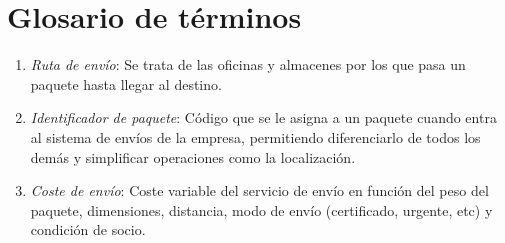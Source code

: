 \newpage

\section{Glosario de términos}
	\begin{enumerate}
		\item \textit{Ruta de envío}: Se trata de las oficinas y almacenes por los que pasa un paquete hasta llegar al destino.
		\item \textit{Identificador de paquete}: Código que se le asigna a un paquete cuando entra al sistema de envíos de la empresa, permitiendo diferenciarlo de todos los demás y simplificar operaciones como la localización.
		\item \textit{Coste de envío}: Coste variable del servicio de envío en función del peso del paquete, dimensiones, distancia, modo de envío (certificado, urgente, etc) y condición de socio.
	\end{enumerate}
\newpage


